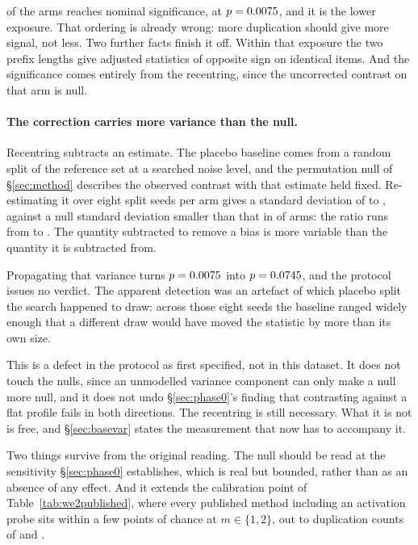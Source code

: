 \documentclass[10pt,twocolumn,letterpaper]{article}
\begin{document}
\PthreeBlocked{} of the \PthreeN{} arms reaches nominal significance, at
$p=0.0075{}$, and it is the lower exposure. That ordering is already
wrong: more duplication should give more signal, not less. Two further facts
finish it off. Within that exposure the two prefix lengths give adjusted
statistics of opposite sign on identical items. And the significance comes
entirely from the recentring, since the uncorrected contrast on that arm is
null.

\paragraph{The correction carries more variance than the null.} Recentring
subtracts an estimate. The placebo baseline comes from a random split of the
reference set at a searched noise level, and the permutation null of
\S\ref{sec:method} describes the observed contrast with that estimate held
fixed. Re-estimating it over eight split seeds per arm gives a standard
deviation of \PthreeBaseSdLo{} to \PthreeBaseSdHi{}, against a null standard
deviation smaller than that in \PthreeRatioAboveOne{} of \PthreeN{} arms: the
ratio runs from \PthreeRatioLo{} to \PthreeRatioHi{}. The quantity subtracted
to remove a bias is more variable than the quantity it is subtracted from.

Propagating that variance turns $p=0.0075{}$ into
$p=0.0745{}$, and the protocol issues no verdict. The apparent
detection was an artefact of which placebo split the search happened to draw:
across those eight seeds the baseline ranged widely enough that a different
draw would have moved the statistic by more than its own size.

This is a defect in the protocol as first specified, not in this dataset. It
does not touch the nulls, since an unmodelled variance component can only make
a null more null, and it does not undo \S\ref{sec:phase0}'s finding that
contrasting against a flat profile fails in both directions. The recentring is
still necessary. What it is not is free, and \S\ref{sec:basevar} states the
measurement that now has to accompany it.

Two things survive from the original reading. The null should be read at the
sensitivity \S\ref{sec:phase0} establishes, which is real but bounded, rather
than as an absence of any effect. And it extends the calibration point of
Table~\ref{tab:we2published}, where every published method including an
activation probe sits within a few points of chance at $m\in\{1,2\}$, out to
duplication counts of \PthreeDupLo{} and \PthreeDupHi{}.
\end{document}
